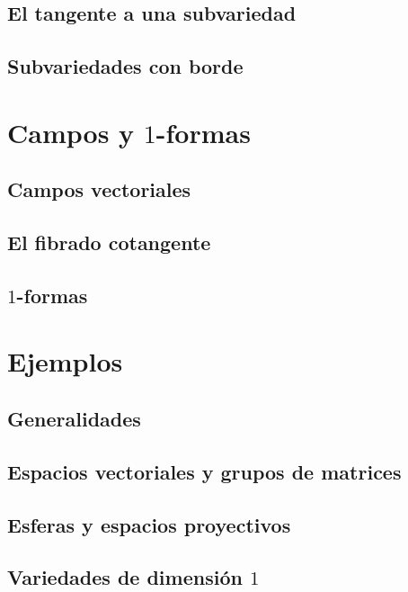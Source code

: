 \documentclass[11pt]{report}
\begin{document}
\section{El tangente a una subvariedad}

%
\section{Subvariedades con borde}

%


\chapter{Campos y $1$-formas}
\section{Campos vectoriales}

%
\section{El fibrado cotangente}

%
\section{$1$-formas}

%


\chapter{Ejemplos}
\section{Generalidades}
%

\section{Espacios vectoriales y grupos de matrices}
%

\section{Esferas y espacios proyectivos}
%
%
\section{Variedades de dimensi\'{o}n $1$}
%
%
\end{document}
